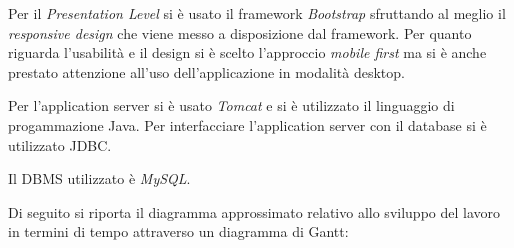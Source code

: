 Per il \emph{Presentation Level} si è usato il framework \emph{Bootstrap} sfruttando al meglio il \emph{responsive design} che viene messo a disposizione dal framework. Per quanto riguarda l'usabilità e il design si è scelto l'approccio \emph{mobile first} ma si è anche prestato attenzione all'uso dell'applicazione in modalità desktop.

Per l'application server si è usato \emph{Tomcat} e si è utilizzato il linguaggio di progammazione Java.
Per interfacciare l'application server con il database si è utilizzato JDBC.

Il DBMS utilizzato è \emph{MySQL}.

Di seguito si riporta il diagramma approssimato relativo allo sviluppo del lavoro in termini di tempo attraverso un diagramma di Gantt: